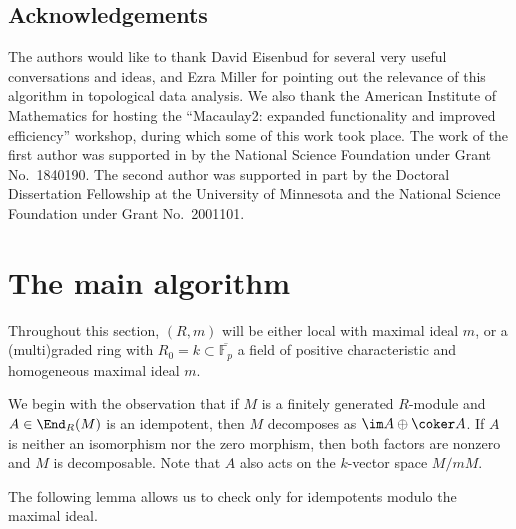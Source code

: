 \documentclass[12pt]{article}
\numberwithin{equation}{section}
\theoremstyle{theorem}
\numberwithin{thm}{section}
\theoremstyle{definition}
\begin{document}
\subsection*{Acknowledgements}
The authors would like to thank David Eisenbud for several very useful conversations and ideas, and Ezra Miller for pointing out the relevance of this algorithm in topological data analysis.
We also thank the American Institute of Mathematics for hosting the ``Macaulay2: expanded functionality and improved efficiency'' workshop, during which some of this work took place.
The work of the first author was supported in by the National Science Foundation under Grant No.~1840190.
The second author was supported in part by the Doctoral Dissertation Fellowship at the University of Minnesota and the National Science Foundation under Grant No.~2001101.




\section{The main algorithm}\label{sec:main-alg}

Throughout this section, $(R,m)$ will be either local with maximal ideal $m$, or a (multi)graded ring with $R_0 = k \subset \overline{\mathbb F_p}$ a field of positive characteristic and homogeneous maximal ideal $m$.

We begin with the observation that if $M$ is a finitely generated $R$-module and $A\in\End_R(M)$ is an idempotent, then $M$ decomposes as $\im A \oplus \coker A$. If $A$ is neither an isomorphism nor the zero morphism, then both factors are nonzero and $M$ is decomposable. Note that $A$ also acts on the $k$-vector space $M/mM$.

The following lemma allows us to check only for idempotents modulo the maximal ideal.
\end{document}
